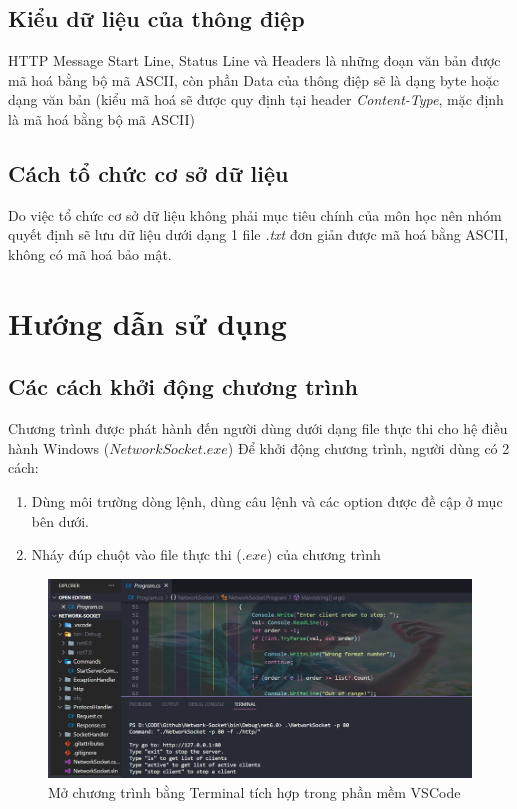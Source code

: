 \documentclass[14pt, a4paper]{extarticle}
\begin{document}
\subsection{Kiểu dữ liệu của thông điệp}

HTTP Message Start Line, Status Line và Headers là những đoạn văn bản được mã hoá bằng bộ mã ASCII, còn phần Data của thông điệp sẽ là dạng byte hoặc dạng văn bản (kiểu mã hoá sẽ được quy định tại header \textit{Content-Type}, mặc định là mã hoá bằng bộ mã ASCII)
\subsection{Cách tổ chức cơ sở dữ liệu}

Do việc tổ chức cơ sở dữ liệu không phải mục tiêu chính của môn học nên nhóm quyết định sẽ lưu dữ liệu dưới dạng 1 file \textit{.txt} đơn giản được mã hoá bằng ASCII, không có mã hoá bảo mật. 
\section{Hướng dẫn sử dụng}
\subsection{Các cách khởi động chương trình}

Chương trình được phát hành đến người dùng dưới dạng file thực thi cho hệ điều hành Windows ($NetworkSocket.exe$) Để khởi động chương trình, người dùng có 2 cách:
\begin{enumerate}
    \item Dùng môi trường dòng lệnh, dùng câu lệnh và các option được đề cập ở mục bên dưới.
    \item Nháy đúp chuột vào file thực thi ($.exe$) của chương trình
\end{enumerate}
\begin{figure}[!h]
    \begin{center}
        \includegraphics{PicGuide/Start.png}
        \caption{Mở chương trình bằng Terminal tích hợp trong phần mềm VSCode}
    \end{center}
\end{figure}
\end{document}
